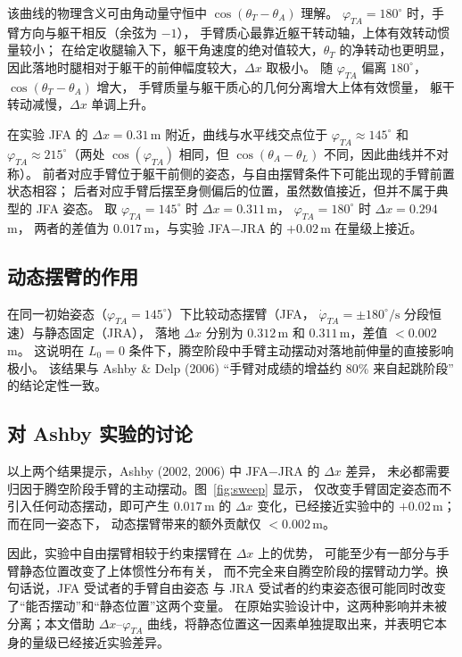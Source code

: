 \documentclass{article}
\begin{document}
该曲线的物理含义可由角动量守恒中 $\cos(\theta_T-\theta_A)$ 理解。
$\varphi_{TA}=180^\circ$ 时，手臂方向与躯干相反（余弦为 $-1$），
手臂质心最靠近躯干转动轴，上体有效转动惯量较小；
在给定收腿输入下，躯干角速度的绝对值较大，$\theta_T$ 的净转动也更明显，
因此落地时腿相对于躯干的前伸幅度较大，$\Delta x$ 取极小。
随 $\varphi_{TA}$ 偏离 $180^\circ$，$\cos(\theta_T-\theta_A)$ 增大，
手臂质量与躯干质心的几何分离增大上体有效惯量，
躯干转动减慢，$\Delta x$ 单调上升。

在实验 JFA 的 $\Delta x=0.31$\,m 附近，曲线与水平线交点位于
$\varphi_{TA}\approx 145^\circ$ 和 $\varphi_{TA}\approx 215^\circ$（两处
$\cos(\varphi_{TA})$ 相同，但 $\cos(\theta_A-\theta_L)$ 不同，因此曲线并不对称）。
前者对应手臂位于躯干前侧的姿态，与自由摆臂条件下可能出现的手臂前置状态相容；
后者对应手臂后摆至身侧偏后的位置，虽然数值接近，但并不属于典型的 JFA 姿态。
取 $\varphi_{TA}=145^\circ$ 时 $\Delta x=0.311$\,m，
$\varphi_{TA}=180^\circ$ 时 $\Delta x=0.294$\,m，
两者的差值为 $0.017$\,m，与实验 JFA$-$JRA 的 $+0.02$\,m 在量级上接近。

\subsection{动态摆臂的作用}

在同一初始姿态（$\varphi_{TA}=145^\circ$）下比较动态摆臂（JFA，
$\dot\varphi_{TA}=\pm 180^\circ/\mathrm{s}$ 分段恒速）与静态固定（JRA），
落地 $\Delta x$ 分别为 $0.312$\,m 和 $0.311$\,m，差值 $<0.002$\,m。
这说明在 $L_0=0$ 条件下，腾空阶段中手臂主动摆动对落地前伸量的直接影响极小。
该结果与 Ashby \& Delp (2006) ``手臂对成绩的增益约 80\% 来自起跳阶段''
的结论定性一致。

\subsection{对 Ashby 实验的讨论}

以上两个结果提示，Ashby (2002, 2006) 中 JFA$-$JRA 的 $\Delta x$ 差异，
未必都需要归因于腾空阶段手臂的主动摆动。图~\ref{fig:sweep} 显示，
仅改变手臂固定姿态而不引入任何动态摆动，即可产生 $0.017$\,m 的
$\Delta x$ 变化，已经接近实验中的 $+0.02$\,m；而在同一姿态下，
动态摆臂带来的额外贡献仅 $<0.002$\,m。

因此，实验中自由摆臂相较于约束摆臂在 $\Delta x$ 上的优势，
可能至少有一部分与手臂静态位置改变了上体惯性分布有关，
而不完全来自腾空阶段的摆臂动力学。换句话说，JFA 受试者的手臂自由姿态
与 JRA 受试者的约束姿态很可能同时改变了“能否摆动”和“静态位置”这两个变量。
在原始实验设计中，这两种影响并未被分离；本文借助 $\Delta x$--$\varphi_{TA}$
曲线，将静态位置这一因素单独提取出来，并表明它本身的量级已经接近实验差异。
\end{document}

